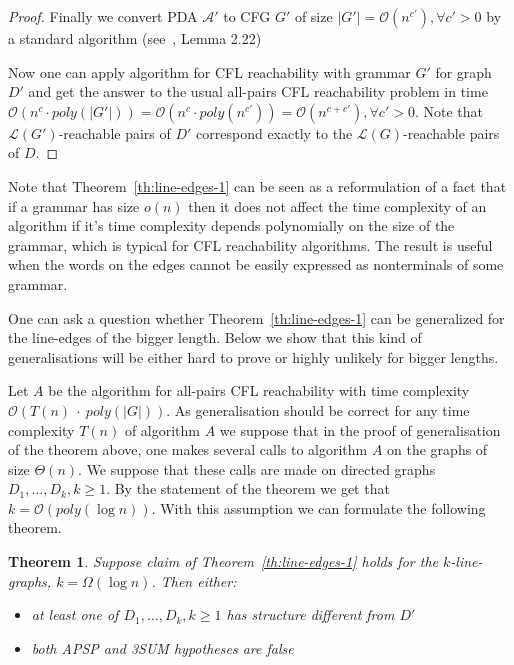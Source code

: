 \documentclass[12pt]{article}
\newtheorem{theorem}{Theorem}[section]
\let\origenumerate\enumerate
\let\origendenumerate\endenumerate
\renewenvironment{enumerate}{\origenumerate[topsep = 0pt, noitemsep]}{\origendenumerate}
\begin{document}
\begin{proof}
\begin{enumerate}
    \item Finally we convert PDA $\mathcal{A}'$ to CFG $G'$ of size  $|G'| = \mathcal{O}(n^{c'}), \forall c' > 0$ by a standard algorithm (see~\cite{10.5555/524279}, Lemma 2.22)
\end{enumerate}

Now one can apply algorithm for CFL reachability with grammar $G'$ for graph $D'$ and get the answer to the usual all-pairs CFL reachability problem in time $\mathcal{O}(n^c \cdot poly(|G'|)) = \mathcal{O}(n^c \cdot poly(n^{c'})) = \mathcal{O}(n^{c+c'}), \forall c' > 0$. Note that $\mathcal{L}(G')$-reachable pairs of $D'$ correspond exactly to the $\mathcal{L}(G)$-reachable pairs of $D$.  

\end{proof}

Note that Theorem~\ref{th:line-edges-1} can be seen as a reformulation of a fact that if a grammar has size $o(n)$ then it does not affect the time complexity of an algorithm if it's time complexity depends polynomially on the size of the grammar, which is typical for CFL reachability algorithms. The result is useful when the words on the edges cannot be easily expressed as nonterminals of some grammar. 

One can ask a question whether Theorem~\ref{th:line-edges-1} can be generalized for the line-edges of the bigger length. Below we show that this kind of generalisations will be either hard to prove or highly unlikely for bigger lengths.

Let $A$ be the algorithm for all-pairs CFL reachability with time complexity $\mathcal{O}(T(n)~\cdot~poly(|G|))$. As generalisation should be correct for any time complexity $T(n)$ of algorithm $A$ we suppose that in the proof of generalisation of the theorem above, one makes several calls to algorithm $A$ on the graphs of size $\Theta(n)$. We suppose that these calls are made on directed graphs $D_1, \ldots, D_k, k \ge 1$. By the statement of the theorem we get that $k = \mathcal{O}(poly(\log n))$. With this assumption we can formulate the following theorem.

\begin{theorem}\label{lemma:no_expansion}
Suppose claim of Theorem~\ref{th:line-edges-1} holds for the $k$-line-graphs, $k = \Omega(\log n)$. Then either:

\begin{itemize}
    \item at least one of $D_1, \ldots, D_k, k \ge 1$ has structure different from $D'$
    \item both APSP and 3SUM hypotheses are false
\end{itemize}
\end{theorem}
\end{document}
